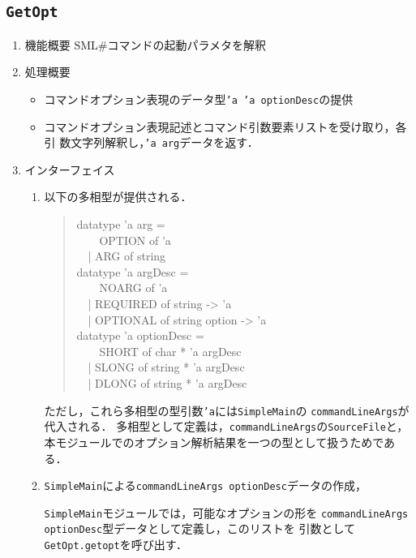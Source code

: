 \documentclass{jbook}
\newcommand{\smlsharp}{SML\#}
\newcommand{\code}[1]{\mbox{\large\tt #1}}
\newcommand{\myem}{\mbox{\ \ }}
\begin{document}
\subsection{\code{GetOpt}}
\begin{enumerate}
\item 機能概要 \smlsharp{}コマンドの起動パラメタを解釈
\item 処理概要 
\begin{itemize}
\item コマンドオプション表現のデータ型\code{'a 'a optionDesc}の提供
\item コマンドオプション表現記述とコマンド引数要素リストを受け取り，各引
数文字列解釈し，\code{'a arg}データを返す．
\end{itemize}
\item インターフェイス 
\begin{enumerate}
\item 以下の多相型が提供される．
\begin{quote}
\begin{tt}
  datatype 'a arg =\\
\myem\ \ OPTION of 'a\\
\myem    | ARG of string\\
  datatype 'a argDesc =\\
\myem\ \     NOARG of 'a\\
\myem    | REQUIRED of string -> 'a\\
\myem    | OPTIONAL of string option -> 'a\\
  datatype 'a optionDesc =\\
\myem\ \       SHORT of char * 'a argDesc\\
\myem    | SLONG of string * 'a argDesc\\
\myem    | DLONG of string * 'a argDesc
\end{tt}
\end{quote}
	ただし，これら多相型の型引数\code{'a}には\code{SimpleMain}の
\code{commandLineArgs}が代入される．
	多相型として定義は，\code{commandLineArgs}の\code{SourceFile}と，
本モジュールでのオプション解析結果を一つの型として扱うためである．
\item \code{SimpleMain}による\code{commandLineArgs optionDesc}データの作成，

	\code{SimpleMain}モジュールでは，可能なオプションの形を
\code{commandLineArgs optionDesc}型データとして定義し，このリストを
引数として\code{GetOpt.getopt}を呼び出す．
\end{enumerate}
\end{enumerate}
\end{document}
